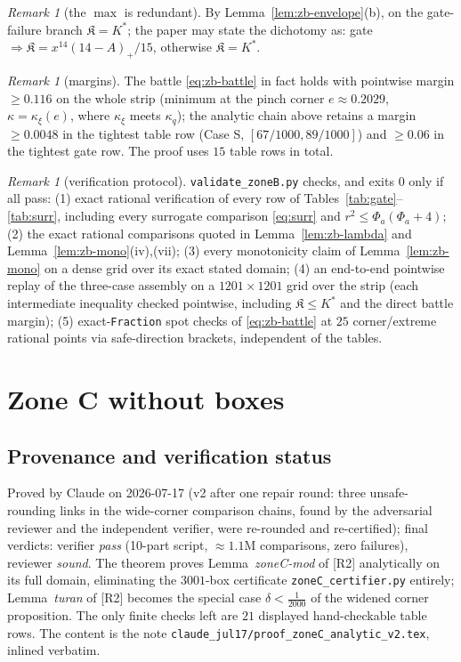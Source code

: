 \documentclass[11pt]{article}
\theoremstyle{remark}
\newtheorem{remark}[theorem]{Remark}
\theoremstyle{plain}
\theoremstyle{plain}
\newcommand{\Kfrak}{\mathfrak K}
\newcommand{\Kstar}{K^{*}}
\newcommand{\kxi}{\kappa_\xi}
\begin{document}
\begin{remark}[the $\max$ is redundant]
By Lemma~\ref{lem:zb-envelope}(b), on the gate-failure branch
$\Kfrak=\Kstar$; the paper may state the dichotomy as: gate
$\Rightarrow\Kfrak=x^{14}(14-A)_+/15$, otherwise $\Kfrak=\Kstar$.
\end{remark}

\begin{remark}[margins]
The battle \eqref{eq:zb-battle} in fact holds with pointwise margin
$\ge0.116$ on the whole strip (minimum at the pinch corner
$e\approx0.2029$, $\kappa=\kxi(e)$, where $\kxi$ meets $\kappa_q$); the
analytic chain above retains a margin $\ge0.0048$ in the tightest table
row (Case S, $[67/1000,89/1000]$) and $\ge0.06$ in the tightest gate row.
The proof uses $15$ table rows in total.
\end{remark}

\begin{remark}[verification protocol]
\texttt{validate\_zoneB.py} checks, and exits $0$ only if all pass:
(1) exact rational verification of every row of
Tables~\ref{tab:gate}--\ref{tab:surr}, including every surrogate comparison
\eqref{eq:surr} and $r^2\le\Phi_a(\Phi_a+4)$;
(2) the exact rational comparisons quoted in Lemma~\ref{lem:zb-lambda} and
Lemma~\ref{lem:zb-mono}(iv),(vii);
(3) every monotonicity claim of Lemma~\ref{lem:zb-mono} on a dense grid over
its exact stated domain;
(4) an end-to-end pointwise replay of the three-case assembly on a
$1201\times1201$ grid over the strip (each intermediate inequality
checked pointwise, including $\Kfrak\le\Kstar$ and the direct battle
margin);
(5) exact-\texttt{Fraction} spot checks of \eqref{eq:zb-battle} at $25$
corner/extreme rational points via safe-direction brackets, independent of
the tables.
\end{remark}

\section{Zone C without boxes}\label{sec:zoneC}

\subsection*{Provenance and verification status}
Proved by Claude on 2026-07-17 (v2 after one repair round: three
unsafe-rounding links in the wide-corner comparison chains, found by the
adversarial reviewer and the independent verifier, were re-rounded and
re-certified); final verdicts: verifier \emph{pass} (10-part script,
$\approx1.1$M comparisons, zero failures), reviewer \emph{sound}.  The
theorem proves Lemma~\emph{zoneC-mod} of [R2] analytically on its full
domain, eliminating the $3001$-box certificate
\texttt{zoneC\_certifier.py} entirely; Lemma~\emph{turan} of [R2] becomes
the special case $\delta<\tfrac1{2000}$ of the widened corner
proposition.  The only finite checks left are $21$ displayed
hand-checkable table rows.  The content is the note
\texttt{claude\_jul17/proof\_zoneC\_analytic\_v2.tex}, inlined verbatim.
\end{document}
